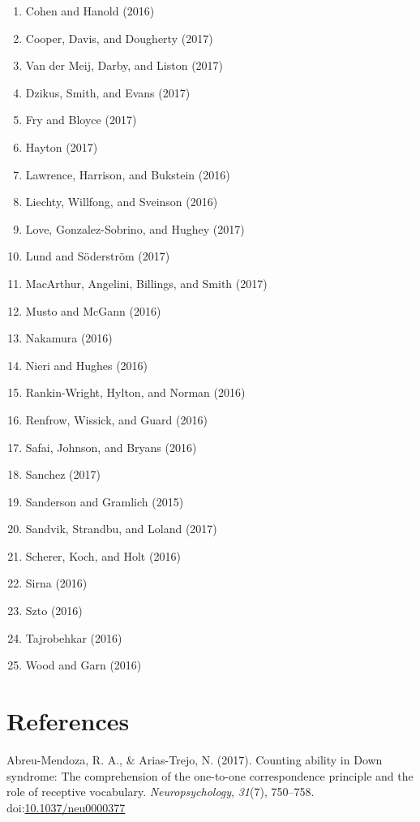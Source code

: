 \documentclass[english,man]{apa6}
\providecommand{\tightlist}{%
  \setlength{\itemsep}{0pt}\setlength{\parskip}{0pt}}
\theoremstyle{definition}
\theoremstyle{definition}
\theoremstyle{definition}
\theoremstyle{remark}
\begin{document}
\begin{enumerate}
\def\labelenumi{\arabic{enumi})}
\tightlist
\item
  Cohen and Hanold (2016)
\item
  Cooper, Davis, and Dougherty (2017)
\item
  Van der Meij, Darby, and Liston (2017)
\item
  Dzikus, Smith, and Evans (2017)
\item
  Fry and Bloyce (2017)
\item
  Hayton (2017)
\item
  Lawrence, Harrison, and Bukstein (2016)
\item
  Liechty, Willfong, and Sveinson (2016)
\item
  Love, Gonzalez-Sobrino, and Hughey (2017)
\item
  Lund and Söderström (2017)
\item
  MacArthur, Angelini, Billings, and Smith (2017)
\item
  Musto and McGann (2016)
\item
  Nakamura (2016)
\item
  Nieri and Hughes (2016)
\item
  Rankin-Wright, Hylton, and Norman (2016)
\item
  Renfrow, Wissick, and Guard (2016)
\item
  Safai, Johnson, and Bryans (2016)
\item
  Sanchez (2017)
\item
  Sanderson and Gramlich (2015)
\item
  Sandvik, Strandbu, and Loland (2017)
\item
  Scherer, Koch, and Holt (2016)
\item
  Sirna (2016)
\item
  Szto (2016)
\item
  Tajrobehkar (2016)
\item
  Wood and Garn (2016)
\end{enumerate}

\newpage

\section{References}\label{references}

\setlength{\parindent}{-0.5in} \setlength{\leftskip}{0.5in}

\hypertarget{refs}{}
\hypertarget{ref-Abreu-Mendoza2017}{}
Abreu-Mendoza, R. A., \& Arias-Trejo, N. (2017). Counting ability in
Down syndrome: The comprehension of the one-to-one correspondence
principle and the role of receptive vocabulary. \emph{Neuropsychology},
\emph{31}(7), 750--758.
doi:\href{https://doi.org/10.1037/neu0000377}{10.1037/neu0000377}
\end{document}

